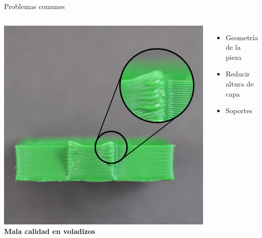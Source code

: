 \documentclass{beamer}
\begin{document}
	\begin{frame}{Problemas comunes}
		\begin{columns}
				\includegraphics[width=\textwidth]{images/Curling-And-Warping}
				\textbf{Mala calidad en voladizos}
				\begin{itemize}
					\item Geometría de la pieza
					\item Reducir altura de capa
					\item Soportes
				\end{itemize}
		\end{columns}
	\end{frame}
\end{document}
